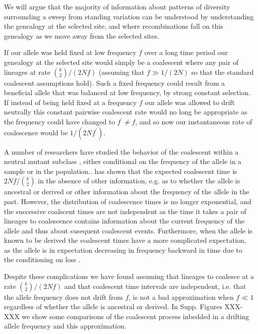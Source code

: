 \documentclass[a4paper,10pt]{article}
\begin{document}
We will argue that the majority of information about patterns of diversity surrounding a sweep from standing variation can be understood by understanding the genealogy at the selected site,
and where recombinations fall on this genealogy as we move away from the selected sites. 

If our allele was held fixed at low frequency $f$ over a long time period our genealogy at the selected site would simply be a coalescent where any pair of lineages at rate $ {k \choose 2}/(2 N f)$ (assuming that $f \gg 1/(2N)$ so that the standard coalescent assumptions hold). Such a fixed frequency could result from a beneficial allele that was balanced at low frequency, by strong constant selection. If instead of being held fixed at a frequency $f$ our allele was allowed to drift neutrally this constant pairwise coalescent rate would no long be appropriate as the frequency could have changed to $f^{\prime} \neq f$, and so now our instantaneous rate of coalescence would be  $1/(2Nf^{\prime})$. 

A number of researchers have studied the behavior of the coalescent within a neutral mutant subclass \citep{XXXX}, either conditional on the frequency of the allele in a sample or in the population.. \cite{XXX} has shown that the expected coalescent time is  $2 N f/ {k \choose 2}$ in the absence of other information, e.g. as to whether the allele is ancestral or derived or other information about the frequency of the allele in the past. However, the distribution of coalescence times is no longer exponential, and the successive coalscent times are not independent \cite{} as the time it takes a pair of lineages to coalescence contains information about the current frequency of the allele and thus about susequent coalescent events. Furthermore, when the allele is known to be derived the coalescent times have a more complicated expectation, as the allele is in expectation decreasing in frequency backward in time due to the conditioning on loss \citep{}.

Despite these complications we have found assuming that lineages to coalesce at a rate $ {k \choose 2}/(2 N f)$ and that coalescent time intervals are independent, i.e. that the allele frequency does not drift from $f$, is not a bad approximation when $f \ll 1$ regardless of whether the allele is ancestral or derived. In Supp. Figures XXX-XXX we show some comparisons of the coalescent process inbedded in a drifting allele frequency and this approximation. 
\end{document}
